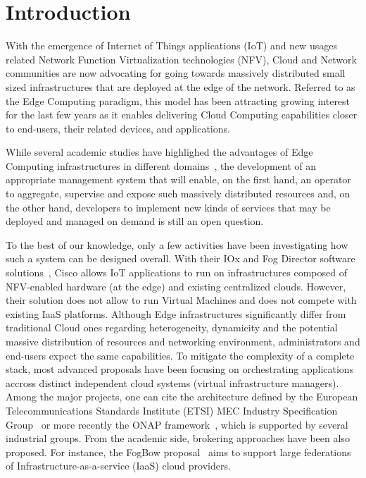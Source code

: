 
\section{Introduction}
\label{sec:intro}


With the emergence of Internet of Things applications (IoT) and new
usages related Network Function
Virtualization technologies (NFV), Cloud and Network communities are now advocating
for going towards massively distributed small sized infrastructures
that are deployed at the edge of the network.
%
Referred to as the Edge Computing paradigm, this model has been attracting
growing interest for the last few years as it enables delivering Cloud
Computing capabilities closer to end-users, their related devices, and
applications.
%

While several academic studies have highlighed the advantages of Edge
Computing infrastructures in different
domains~\cite{bonomi2012fog,zhang2015cloud,7574435,satyanarayanan2017emergence},
the development of
an appropriate management system that will enable, on the first hand,
an operator to aggregate, supervise and expose such massively
distributed resources and, on the other hand, developers to implement
new kinds of services that may be deployed and managed on demand is
still an open question.

To the best of our knowledge, only a few activities have been
investigating how such a system can be designed overall.  With their
IOx and Fog Director software solutions~\cite{bonomi2012fog}, Cisco allows IoT
applications to run on infrastructures composed of NFV-enabled
hardware (at the edge) and existing centralized clouds. However, their
solution does not allow to run Virtual Machines  and does not compete
with existing IaaS platforms.
%
Although Edge infrastructures significantly differ from traditional Cloud ones
regarding heterogeneity, dynamicity and the potential massive
distribution of resources and networking environment, administrators and end-users expect the same capabilities.
To mitigate the complexity of a complete stack, most advanced proposals have been focusing
on orchestrating applications accross distinct independent cloud
systems (\aka virtual infrastructure managers).
%
Among the major projects, one can cite the architecture
defined by the European Telecommunications Standards Institute (ETSI)
MEC Industry Specification Group~\cite{7574435} or more recently the
ONAP framework~\cite{onap}, which is supported by several industrial groups. 
From the academic side, brokering approaches have been also proposed.
For instance, the FogBow proposal~\cite{brasileiro2016fogbow} aims to support large
federations of Infrastructure-as-a-service (IaaS) cloud providers.

